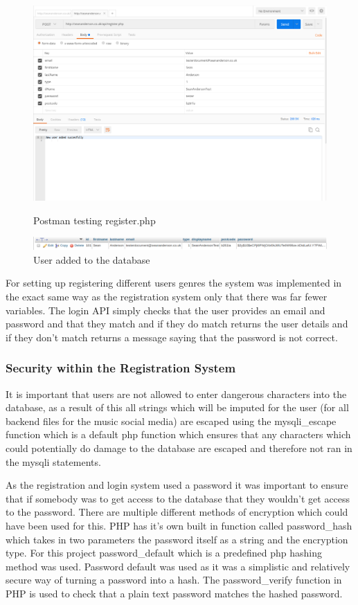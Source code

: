 \begin{figure}[H]
\includegraphics[scale=0.5]{images/postman}
\caption{Postman testing register.php}
\includegraphics[scale=0.5]{images/db1}
\caption{User added to the database}
\end{figure}

For setting up registering different users genres the system was implemented in the exact same way as the registration system only that there was far fewer variables. The login API simply checks that the user provides an email and password and that they match and if they do match returns the user details and if they don't match returns a message saying that the password is not correct.

\subsubsection{Security within the Registration System}
It is important that users are not allowed to enter dangerous characters into the database, as a result of this all strings which will be imputed for the user (for all backend files for the music social media) are escaped using the mysqli\_escape function which is a default php function which ensures that any characters which could potentially do damage to the database are escaped and therefore not ran in the mysqli statements.

As the registration and login system used a password it was important to ensure that if somebody was to get access to the database that they wouldn't get access to the password. There are multiple different methods of encryption which could have been used for this. PHP has it's own built in function called password\_hash which takes in two parameters the password itself as a string and the encryption type. For this project password\_default which is a predefined php hashing method was used. Password default was used as it was a simplistic and relatively secure way of turning a password into a hash. The password\_verify function in PHP is used to check that a plain text password matches the hashed password.
 
